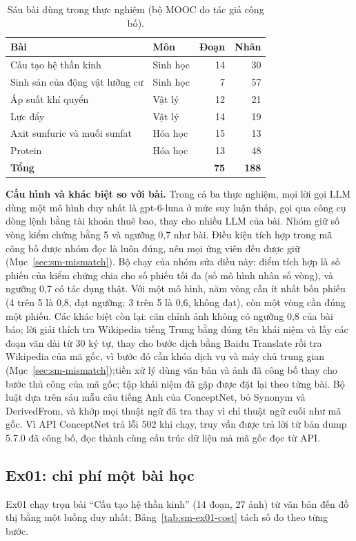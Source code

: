 \begin{table}[t]
\centering
\caption{Sáu bài dùng trong thực nghiệm (bộ MOOC do tác giả công bố).}
\label{tab:sm-lessons}
\small
\begin{tabular}{@{}llrr@{}}
\toprule
Bài & Môn & Đoạn & Nhãn \\
\midrule
Cấu tạo hệ thần kinh & Sinh học & 14 & 30 \\
Sinh sản của động vật lưỡng cư & Sinh học & 7 & 57 \\
Áp suất khí quyển & Vật lý & 12 & 21 \\
Lực đẩy & Vật lý & 14 & 19 \\
Axit sunfuric và muối sunfat & Hóa học & 15 & 13 \\
Protein & Hóa học & 13 & 48 \\
\midrule
\textbf{Tổng} & & \textbf{75} & \textbf{188} \\
\bottomrule
\end{tabular}
\end{table}

\textbf{Cấu hình và khác biệt so với bài.}
Trong cả ba thực nghiệm, mọi lời gọi LLM dùng một mô hình duy nhất là gpt-6-luna ở mức suy luận thấp, gọi qua công cụ dòng lệnh bằng tài khoản thuê bao, thay cho nhiều LLM của bài.
Nhóm giữ số vòng kiểm chứng bằng 5 và ngưỡng 0,7 như bài.
Điều kiện tích hợp trong mã công bố được nhóm đọc là luôn đúng, nên mọi ứng viên đều được giữ (Mục~\ref{sec:sm-mismatch}).
Bộ chạy của nhóm sửa điều này: điểm tích hợp là số phiếu của kiểm chứng chia cho số phiếu tối đa (số mô hình nhân số vòng), và ngưỡng 0,7 có tác dụng thật.
Với một mô hình, năm vòng cần ít nhất bốn phiếu (4 trên 5 là 0,8, đạt ngưỡng; 3 trên 5 là 0,6, không đạt), còn một vòng cần đúng một phiếu.
Các khác biệt còn lại: căn chỉnh ảnh không có ngưỡng 0,8 của bài báo; lời giải thích tra Wikipedia tiếng Trung bằng đúng tên khái niệm và lấy các đoạn văn dài từ 30 ký tự, thay cho bước dịch bằng Baidu Translate rồi tra Wikipedia của mã gốc, vì bước đó cần khóa dịch vụ và máy chủ trung gian (Mục~\ref{sec:sm-mismatch});tiền xử lý dùng văn bản và ảnh đã công bố thay cho bước thủ công của mã gốc; tập khái niệm đã gặp được đặt lại theo từng bài.
Bộ luật dựa trên sáu mẫu câu tiếng Anh của ConceptNet, bỏ Synonym và DerivedFrom, và khớp mọi thuật ngữ đã tra thay vì chỉ thuật ngữ cuối như mã gốc.
Vì API ConceptNet trả lỗi 502 khi chạy, truy vấn được trả lời từ bản dump 5.7.0 đã công bố, đọc thành cùng cấu trúc dữ liệu mà mã gốc đọc từ API.

\subsection{Ex01: chi phí một bài học}\label{sec:sm-ex01}
Ex01 chạy trọn bài ``Cấu tạo hệ thần kinh'' (14 đoạn, 27 ảnh) từ văn bản đến đồ thị bằng một luồng duy nhất; Bảng~\ref{tab:sm-ex01-cost} tách số đo theo từng bước.

